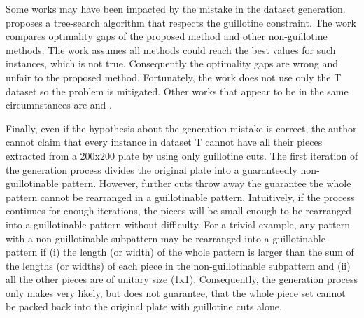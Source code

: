 Some works may have been impacted by the mistake in the dataset generation.
\citet{bortfeldt:2012} %
proposes a tree-search algorithm that respects the guillotine constraint.
The work compares optimality gaps of the proposed method and other non-guillotine methods.
The work assumes all methods could reach the best values for such instances, which is not true.
Consequently the optimality gaps are wrong and unfair to the proposed method.
Fortunately, the work does not use only the T dataset so the problem is mitigated.
Other works that appear to be in the same circumnstances are
\citet{thomas:2014} and %
\citet{shang:2020}. %

Finally, even if the hypothesis about the generation mistake is correct, the author cannot claim that every instance in dataset T cannot have all their pieces extracted from a 200x200 plate by using only guillotine cuts.
The first iteration of the generation process divides the original plate into a guaranteedly non-guillotinable pattern.
However, further cuts throw away the guarantee the whole pattern cannot be rearranged in a guillotinable pattern.
Intuitively, if the process continues for enough iterations, the pieces will be small enough to be rearranged into a guillotinable pattern without difficulty.
For a trivial example, any pattern with a non-guillotinable subpattern may be rearranged into a guillotinable pattern if (i) the length (or width) of the whole pattern is larger than the sum of the lengths (or widths) of each piece in the non-guillotinable subpattern and (ii) all the other pieces are of unitary size (1x1).
Consequently, the generation process only makes very likely, but does not guarantee, that the whole piece set cannot be packed back into the original plate with guillotine cuts alone.

